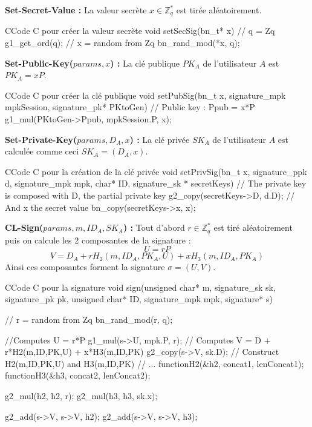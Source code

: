 \textbf{Set-Secret-Value :} La valeur secrète $x \in \mathbb{Z}_q^*$ est tirée aléatoirement.

\begin{sourcebox}{C}{Code C pour créer la valeur secrète}
	void setSecSig(bn_t* x){
		// q = Zq
		g1_get_ord(q);
		// x = random from Zq
		bn_rand_mod(*x, q);
	}
\end{sourcebox}

\textbf{Set-Public-Key($params, x$) :}  La clé publique $PK_A$ de l'utilisateur $A$ est $PK_A = xP$.

\begin{sourcebox}{C}{Code C pour créer la clé publique}
	void setPubSig(bn_t x, signature_mpk mpkSession, signature_pk* PKtoGen){
		// Public key : Ppub = x*P
		g1_mul(PKtoGen->Ppub, mpkSession.P, x);
	}
\end{sourcebox}

\textbf{Set-Private-Key($params, D_A, x$) :} La clé privée $SK_A$ de l'utilisateur $A$ est calculée comme ceci $SK_A = (D_A, x)$.

\begin{sourcebox}{C}{Code C pour la création de la clé privée}
	void setPrivSig(bn_t x, signature_ppk d, signature_mpk mpk, char* ID, signature_sk * secretKeys){
		// The private key is composed with D, the partial private key
		g2_copy(secretKeys->D, d.D);
		// And x the secret value
		bn_copy(secretKeys->x, x);
	}
\end{sourcebox}

\textbf{CL-Sign($params, m, ID_A, SK_A$) :} Tout d'abord $r \in \mathbb{Z}_q^*$ est tiré aléatoirement puis on calcule les 2 composantes de la signature :
\[ U = rP\]
\[V = D_A + rH_2(m, ID_A, PK_A,U) + xH_3(m, ID_A, PK_A)\]
Ainsi ces composantes forment la signature $\sigma = (U,V)$.

\begin{sourcebox}{C}{Code C pour la signature}
	void sign(unsigned char* m, signature_sk sk, signature_pk pk, unsigned char* ID, signature_mpk mpk, signature* s){
		// r = random from Zq
		bn_rand_mod(r, q);
		
		//Computes U = r*P
		g1_mul(s->U, mpk.P, r);
		// Computes V = D + r*H2(m,ID,PK,U) + x*H3(m,ID,PK)
		g2_copy(s->V, sk.D);
		// Construct H2(m,ID,PK,U) and H3(m,ID,PK)
		// ...
		functionH2(&h2, concat1, lenConcat1);
		functionH3(&h3, concat2, lenConcat2);
		
		g2_mul(h2, h2, r);
		g2_mul(h3, h3, sk.x);
		
		g2_add(s->V, s->V, h2);
		g2_add(s->V, s->V, h3);
	}
\end{sourcebox}

